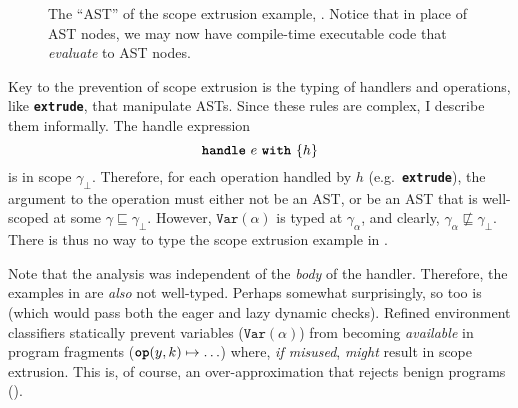 \begin{figure}

\caption{The ``AST'' of the scope extrusion example, . Notice that in place of AST nodes, we may now have compile-time executable code that \textit{evaluate} to AST nodes.}%
\label{fig:classifier-ast-scope-extrusion}
\end{figure}

Key to the prevention of scope extrusion is the typing of handlers and operations, like \textbf{\texttt{extrude}}, that manipulate ASTs. Since these rules are complex, I describe them informally. The handle expression
\[\textbf{\texttt{handle}} \,\, {e} \,\, \textbf{\texttt{with}} \,\, \{{h}\}\]
is in scope $\gamma_{\bot}$. Therefore, for each operation handled by $h$ (e.g.\ \textbf{\texttt{extrude}}), the argument to the operation must either not be an AST, or be an AST that is well-scoped at some $\gamma \sqsubseteq \gamma_{\bot}$. 
However, $\texttt{Var}(\alpha)$ is typed at $\gamma_{\alpha}$, and clearly, $\gamma_{\alpha} \not\sqsubseteq \gamma_{\bot}$. There is thus no way to type the scope extrusion example in .

Note that the analysis was independent of the \textit{body} of the handler. Therefore, the examples in  are \textit{also} not well-typed. Perhaps somewhat surprisingly, so too is  (which would pass both the eager and lazy dynamic checks). Refined environment classifiers statically prevent variables ($\texttt{Var}(\alpha)$) from becoming \textit{available} in program fragments ($\texttt{\textbf{op}}(y, k) \mapsto \ldots$) where, \textit{if misused}, \textit{might} result in scope extrusion. This is, of course, an over-approximation that rejects benign programs ().

